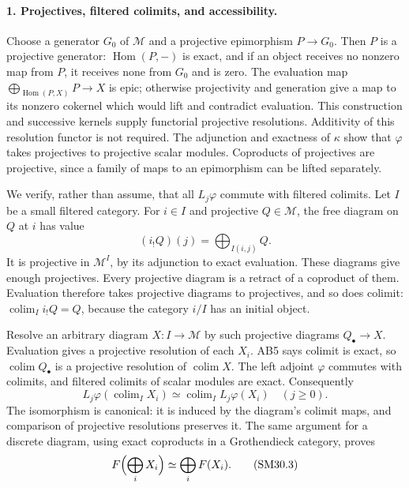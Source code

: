 \documentclass[11pt,a4paper]{article}
\theoremstyle{definition}\newtheorem{definition}[theorem]{Definition}
\theoremstyle{remark}\newtheorem{remark}[theorem]{Remark}
\begin{document}
\paragraph{1. Projectives, filtered colimits, and accessibility.}
Choose a generator \(G_0\) of \(\mathcal M\) and a projective
epimorphism \(P\to G_0\).  Then \(P\) is a projective generator:
\(\operatorname{Hom}(P,-)\) is exact, and if an object receives
no nonzero map from \(P\), it receives none from \(G_0\) and
is zero.  The evaluation map
\(\bigoplus_{\operatorname{Hom}(P,X)}P\to X\) is epic;
otherwise projectivity and generation give a map to its nonzero
cokernel which would lift and contradict evaluation.
This construction and successive kernels supply functorial
projective resolutions.  Additivity of this resolution functor
is not required.  The adjunction and exactness of \(\kappa\)
show that \(\varphi\) takes projectives to projective scalar
modules.  Coproducts of projectives are projective, since a
family of maps to an epimorphism can be lifted separately.

We verify, rather than assume, that all \(L_j\varphi\) commute
with filtered colimits.  Let \(I\) be a small filtered category.
For \(i\in I\) and projective \(Q\in\mathcal M\), the free
diagram on \(Q\) at \(i\) has value
\[
 (i_!Q)(j)=\bigoplus_{I(i,j)}Q.
\]
It is projective in \(\mathcal M^I\), by its adjunction to
exact evaluation.  These diagrams give enough projectives.
Every projective diagram is a retract of a coproduct of them.
Evaluation therefore takes projective diagrams to projectives,
and so does colimit: \(\operatorname{colim}_I i_!Q=Q\),
because the category \(i/I\) has an initial object.

Resolve an arbitrary diagram \(X:I\to\mathcal M\) by such
projective diagrams \(Q_\bullet\to X\).
Evaluation gives a projective resolution of each \(X_i\).
AB5 says colimit is exact, so \(\operatorname{colim}Q_\bullet\)
is a projective resolution of \(\operatorname{colim}X\).
The left adjoint \(\varphi\) commutes with colimits, and
filtered colimits of scalar modules are exact.  Consequently
\[
 L_j\varphi(\operatorname{colim}_I X_i)
   \simeq\operatorname{colim}_I L_j\varphi(X_i)
       \quad(j\ge0).                                    \tag{SM30.2}
\]
The isomorphism is canonical: it is induced by the diagram's
colimit maps, and comparison of projective resolutions preserves
it.  The same argument for a discrete diagram, using exact
coproducts in a Grothendieck category, proves
\[
 F\Bigl(\bigoplus_i X_i\Bigr)\simeq\bigoplus_i F(X_i).
                                                               \tag{SM30.3}
\]
\end{document}
